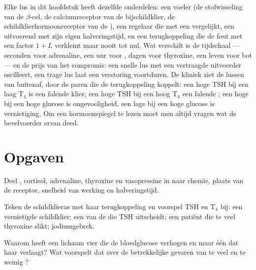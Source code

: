 \begin{remark}\label{rem:b3:endocrinology:control}
Elke lus in dit hoofdstuk heeft dezelfde onderdelen: een voeler (de
stofwisseling van de $\beta$-cel, de calciumreceptor van de
bijschildklier, de schildklierhormoonreceptor van de ), een
regelaar die met een  vergelijkt, een uitvoerend  met
zijn eigen halveringstijd, en een terugkoppeling die de fout met een
factor $1 + L$ verkleint maar nooit tot nul. Wat verschilt is de
tijdschaal --- seconden voor adrenaline, een uur voor , dagen
voor thyroxine, een leven voor bot --- en de prijs van het compromis:
een snelle lus met een vertraagde uitvoerder oscilleert, een trage lus
laat een verstoring voortduren. De kliniek ziet de lussen van buitenaf,
door de paren die de terugkoppeling koppelt: een hoge TSH bij een laag
T$_{4}$ is een falende klier, een hoge TSH bij een hoog T$_{4}$ een
falende ; een hoge  bij een hoge glucose is
ongevoeligheid, een lage  bij een hoge glucose is vernietiging.
Om een hormoonspiegel te lezen moet men altijd vragen wat de
bevelvoerder ervan deed.
\end{remark}

\section{Opgaven}

\begin{exercise}[$\star$]\label{exo:b3:endocrinology:1}
Deel , cortisol, adrenaline, thyroxine en vasopressine in naar
chemie, plaats van de receptor, snelheid van werking en halveringstijd.
\end{exercise}

\begin{exercise}[$\star$]\label{exo:b3:endocrinology:2}
Teken de schildklieras met haar terugkoppeling en voorspel TSH en
T$_{4}$ bij: een vernietigde schildklier; een  van de  die
TSH uitscheidt; een patiënt die te veel thyroxine slikt; jodiumgebrek.
\end{exercise}

\begin{exercise}[$\star$]\label{exo:b3:endocrinology:3}
Waarom heeft een lichaam vier  die de bloedglucose verhogen en
maar één dat haar verlaagt? Wat voorspelt dat over de betrekkelijke
gevaren van te veel en te weinig ?
\end{exercise}

